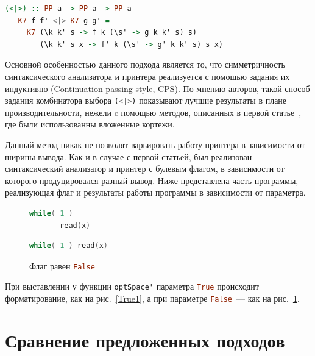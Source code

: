 \begin{lstlisting}[mathescape,language=Haskell]
   (<|>) :: PP a -> PP a -> PP a
   K7 f f' <|> K7 g g' =
     K7 (\k k' s -> f k (\s' -> g k k' s) s)
        (\k k' s x -> f' k (\s' -> g' k k' s) s x)
\end{lstlisting}

Основной особенностью данного подхода является то, что симметричность синтаксического 
анализатора и принтера реализуется с помощью задания их индуктивно (Continuation-passing style, CPS). 
По мнению авторов, такой способ задания комбинатора выбора \lstinline[language=Haskell]{(<|>)} 
показывают лучшие результаты в плане производительности, нежели c помощью методов, описанных 
в первой статье~\cite{Rendel}, где были использованны вложенные кортежи. 

Данный метод никак не позволят варьировать работу принтера в зависимости от ширины вывода. 
Как и в случае с первой статьей, был реализован синтаксический анализатор и принтер с булевым флагом, 
в зависимости от которого продуцировался разный вывод. Ниже представлена часть программы, 
реализующая флаг и результаты работы программы в зависимости от параметра.

\begin{figure}[h]
  \centering
  \begin{minipage}[h]{0.4\textwidth}
    \begin{lstlisting}[language=C]
    while( 1 )
       read(x)
    \end{lstlisting}
    \caption{Флаг равен \lstinline[language=Haskell]{True}}
    \label{True1}
  \end{minipage}
  \hfill
  \begin{minipage}[h]{0.4\textwidth}
    \begin{lstlisting}[language=C]
    while( 1 ) read(x)
    \end{lstlisting}
    \caption{Флаг равен \lstinline[language=Haskell]{False}}
    \label{False1}
  \end{minipage}
\end{figure}

При выставлении у функции \lstinline[language=Haskell]{optSpace'} параметра \lstinline[language=Haskell]{True} 
происходит форматирование, как на рис.~\ref{True1}, а при параметре \lstinline[language=Haskell]{False}~--- как на рис.~\ref{False1}.

\section{Сравнение предложенных подходов}


